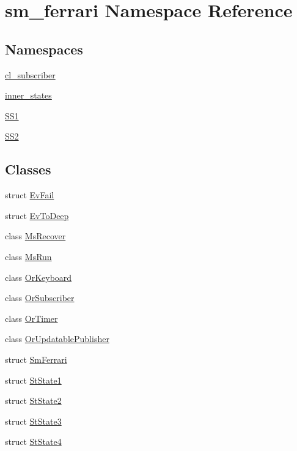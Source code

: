 \hypertarget{namespacesm__ferrari}{}\section{sm\+\_\+ferrari Namespace Reference}
\label{namespacesm__ferrari}
\subsection*{Namespaces}
\begin{DoxyCompactItemize}
\item 
 \hyperlink{namespacesm__ferrari_1_1cl__subscriber}{cl\+\_\+subscriber}
\item 
 \hyperlink{namespacesm__ferrari_1_1inner__states}{inner\+\_\+states}
\item 
 \hyperlink{namespacesm__ferrari_1_1SS1}{S\+S1}
\item 
 \hyperlink{namespacesm__ferrari_1_1SS2}{S\+S2}
\end{DoxyCompactItemize}
\subsection*{Classes}
\begin{DoxyCompactItemize}
\item 
struct \hyperlink{structsm__ferrari_1_1EvFail}{Ev\+Fail}
\item 
struct \hyperlink{structsm__ferrari_1_1EvToDeep}{Ev\+To\+Deep}
\item 
class \hyperlink{classsm__ferrari_1_1MsRecover}{Ms\+Recover}
\item 
class \hyperlink{classsm__ferrari_1_1MsRun}{Ms\+Run}
\item 
class \hyperlink{classsm__ferrari_1_1OrKeyboard}{Or\+Keyboard}
\item 
class \hyperlink{classsm__ferrari_1_1OrSubscriber}{Or\+Subscriber}
\item 
class \hyperlink{classsm__ferrari_1_1OrTimer}{Or\+Timer}
\item 
class \hyperlink{classsm__ferrari_1_1OrUpdatablePublisher}{Or\+Updatable\+Publisher}
\item 
struct \hyperlink{structsm__ferrari_1_1SmFerrari}{Sm\+Ferrari}
\item 
struct \hyperlink{structsm__ferrari_1_1StState1}{St\+State1}
\item 
struct \hyperlink{structsm__ferrari_1_1StState2}{St\+State2}
\item 
struct \hyperlink{structsm__ferrari_1_1StState3}{St\+State3}
\item 
struct \hyperlink{structsm__ferrari_1_1StState4}{St\+State4}
\end{DoxyCompactItemize}
